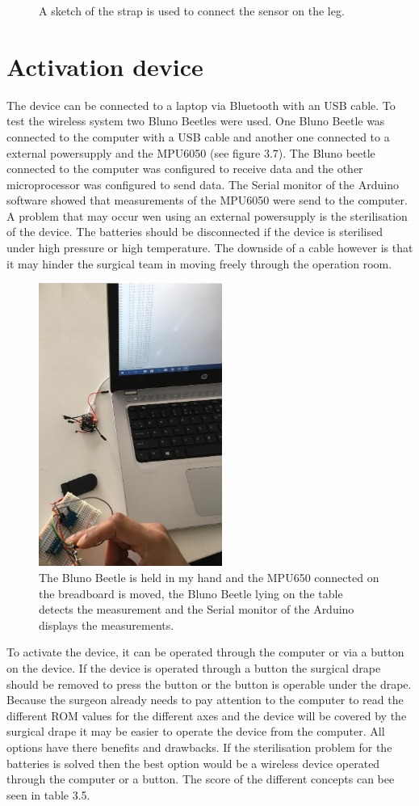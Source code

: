 \documentclass[whitelogo]{tudelft-report}
\begin{document}
{{{\begin{figure}[!htb]
	\caption{A sketch of the strap is used to connect the sensor on the leg.}
	\label{fig:my_label}
\end{figure}

\section{Activation device}
The device can be connected to a laptop via Bluetooth with an USB cable. To test the wireless system two Bluno Beetles were used. One Bluno Beetle was connected to the computer with a USB cable and another one connected to a external powersupply and the MPU6050 (see figure 3.7). The Bluno beetle connected to the computer was configured to receive data and the other microprocessor was configured to send data. The Serial monitor of the Arduino software showed that measurements of the MPU6050 were send to the computer. A problem that may occur wen using an external powersupply is the sterilisation of the device. The batteries should be disconnected if the device is sterilised under high pressure or high temperature. The downside of a cable however is that it may hinder the surgical team in moving freely through the operation room. 
\begin{figure}[!htb]
	\centering\includegraphics[width=170pt]{bluetooth_bluno_beetle.jpeg}
	\caption{The Bluno Beetle is held in my hand and the MPU650 connected on the breadboard is moved, the Bluno Beetle lying on the table detects the measurement and the Serial monitor of the Arduino displays the measurements.}
\end{figure} 
\newline
\newline
To activate the device, it can be operated through the computer or via a button on the device. If the device is operated through a button the surgical drape should be removed to press the button or the button is operable under the drape. Because the surgeon already needs to pay attention to the computer to read the different ROM values for the different axes and the device will be covered by the surgical drape it may be easier to operate the device from the computer. All options have there benefits and drawbacks. If the sterilisation problem for the batteries is solved then the best option would be a wireless device operated through the computer or a button. The score of the different concepts can bee seen in table 3.5.

}}}
\end{document}

